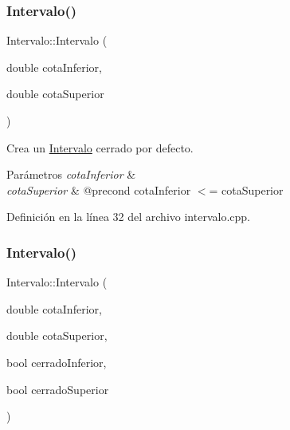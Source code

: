 \subsubsection{\texorpdfstring{Intervalo()}{Intervalo()}\hspace{0.1cm}{\footnotesize\ttfamily [1/2]}}
{\footnotesize\ttfamily Intervalo\+::\+Intervalo (\begin{DoxyParamCaption}\item[{double}]{cota\+Inferior,  }\item[{double}]{cota\+Superior }\end{DoxyParamCaption})}



Crea un \mbox{\hyperlink{classIntervalo}{Intervalo}} cerrado por defecto. 


\begin{DoxyParams}{Parámetros}
{\em cota\+Inferior} & \\
\hline
{\em cota\+Superior} & @precond cota\+Inferior $<$= cota\+Superior \\
\hline
\end{DoxyParams}


Definición en la línea 32 del archivo intervalo.\+cpp.


\begin{DoxyCode}{0}

\end{DoxyCode}
\mbox{\label{classIntervalo_af70d523399465f51862977a303656c72}} 
\subsubsection{\texorpdfstring{Intervalo()}{Intervalo()}\hspace{0.1cm}{\footnotesize\ttfamily [2/2]}}
{\footnotesize\ttfamily Intervalo\+::\+Intervalo (\begin{DoxyParamCaption}\item[{double}]{cota\+Inferior,  }\item[{double}]{cota\+Superior,  }\item[{bool}]{cerrado\+Inferior,  }\item[{bool}]{cerrado\+Superior }\end{DoxyParamCaption})}



